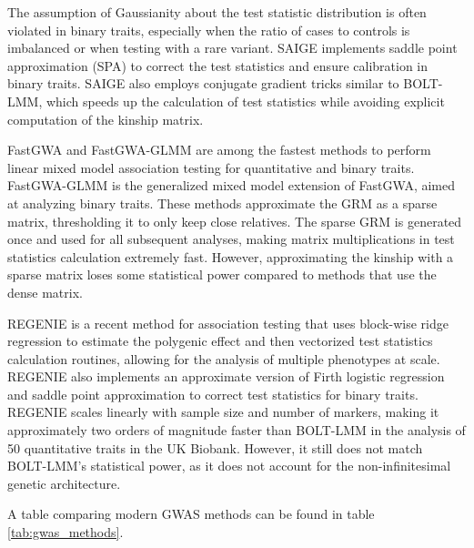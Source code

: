 The assumption of Gaussianity about the test statistic distribution is often violated in binary traits, especially when the ratio of cases to controls is imbalanced or when testing with a rare variant. SAIGE \cite{zhou2018efficiently} implements saddle point approximation (SPA) \cite{kuonen1999miscellanea,dey2017fast} to correct the test statistics and ensure calibration in binary traits. SAIGE also employs conjugate gradient tricks similar to BOLT-LMM, which speeds up the calculation of test statistics while avoiding explicit computation of the kinship matrix.

FastGWA \cite{jiang2019resource} and FastGWA-GLMM \cite{jiang2021generalized} are among the fastest methods to perform linear mixed model association testing for quantitative and binary traits. FastGWA-GLMM is the generalized mixed model extension of FastGWA, aimed at analyzing binary traits. These methods approximate the GRM as a sparse matrix, thresholding it to only keep close relatives. The sparse GRM is generated once and used for all subsequent analyses, making matrix multiplications in test statistics calculation extremely fast. However, approximating the kinship with a sparse matrix loses some statistical power compared to methods that use the dense matrix.

REGENIE \cite{mbatchou2021computationally} is a recent method for association testing that uses block-wise ridge regression to estimate the polygenic effect and then vectorized test statistics calculation routines, allowing for the analysis of multiple phenotypes at scale. REGENIE also implements an approximate version of Firth logistic regression and saddle point approximation to correct test statistics for binary traits. REGENIE scales linearly with sample size and number of markers, making it approximately two orders of magnitude faster than BOLT-LMM in the analysis of 50 quantitative traits in the UK Biobank. However, it still does not match BOLT-LMM's statistical power, as it does not account for the non-infinitesimal genetic architecture.

A table comparing modern GWAS methods can be found in table \ref{tab:gwas_methods}. 


